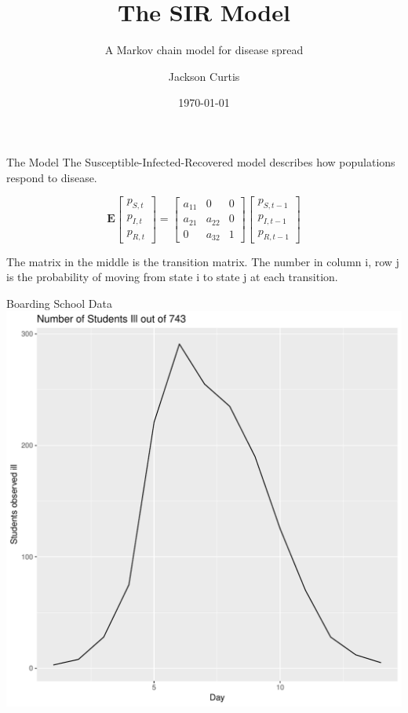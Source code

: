 \documentclass[10pt,table]{beamer}
\title{The SIR Model}
\subtitle{A Markov chain model for disease spread}
\date{\today}
\author{Jackson Curtis}
\institute{Brigham Young University}
\begin{document}
\maketitle

\begin{frame}[fragile]{The Model}
The Susceptible-Infected-Recovered model describes how populations respond to disease.

$$\mathbf{E}\begin{bmatrix}
    p_{S,t}       \\
    p_{I,t}      \\

    p_{R,t}     
\end{bmatrix}
=
\begin{bmatrix}
a_{11} & 0 & 0 \\
a_{21} & a_{22} & 0 \\
0 & a_{32} & 1
\end{bmatrix}
\begin{bmatrix}
    p_{S,t-1}       \\
    p_{I,t-1}      \\

    p_{R,t-1}     
\end{bmatrix}
\label{sdf}
$$

The matrix in the middle is the transition matrix. The number in column i, row j is the probability of moving from state i to state j at each transition.
\end{frame}

\begin{frame}[fragile]{Boarding School Data}
\centering
\includegraphics[scale=.45]{BoardingData.pdf}

\end{frame}
\end{document}
